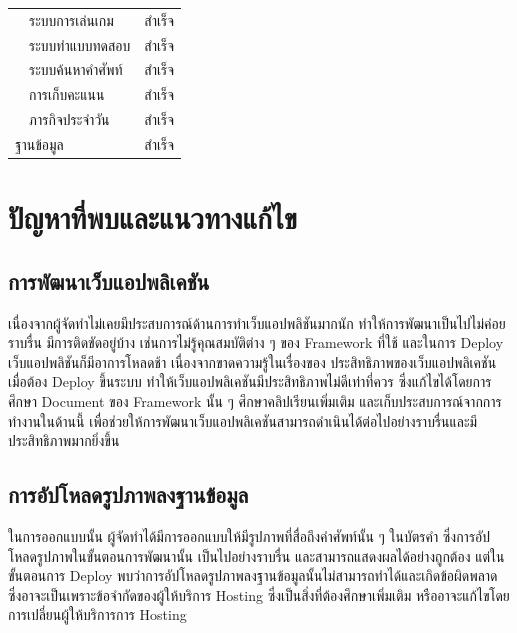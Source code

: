 \documentclass[12pt,oneside,openright,a4paper]{cpe-thai-project}
\begin{document}
\begin{table}[h]
\begin{tabular}{|llc|}
		\multicolumn{1}{|l|}{}                                     & \multicolumn{1}{l|}{ระบบการเล่นเกม}  & สำเร็จ \\ \cline{2-3}
		\multicolumn{1}{|l|}{}                                     & \multicolumn{1}{l|}{ระบบทำแบบทดสอบ}  & สำเร็จ \\ \cline{2-3}
		\multicolumn{1}{|l|}{}                                     & \multicolumn{1}{l|}{ระบบค้นหาคำศัพท์}   & สำเร็จ \\ \cline{2-3}
		\multicolumn{1}{|l|}{}                                     & \multicolumn{1}{l|}{การเก็บคะแนน}    & สำเร็จ \\ \cline{2-3}
		\multicolumn{1}{|l|}{}                                     & \multicolumn{1}{l|}{ภารกิจประจำวัน}    & สำเร็จ \\ \hline
		\multicolumn{2}{|l|}{ฐานข้อมูล}                              & สำเร็จ                                       \\ \hline
	\end{tabular}
\end{table}

\section{ปัญหาที่พบและแนวทางแก้ไข}
\subsection{การพัฒนาเว็บแอปพลิเคชัน}
\hspace{1cm}
เนื่องจากผู้จัดทำไม่เคยมีประสบการณ์ด้านการทำเว็บแอปพลิชันมากนัก ทำให้การพัฒนาเป็นไปไม่ค่อยราบรื่น มีการติดขัดอยู่บ้าง
เช่นการไม่รู้คุณสมบัติต่าง ๆ ของ Framework ที่ใช้ และในการ Deploy เว็บแอปพลิชันก็มีอาการโหลดช้า เนื่องจากขาดความรู้ในเรื่องของ
ประสิทธิภาพของเว็บแอปพลิเคชันเมื่อต้อง Deploy ขึ้นระบบ ทำให้เว็บแอปพลิเคชันมีประสิทธิภาพไม่ดีเท่าที่ควร
ซึ่งแก้ไขได้โดยการศึกษา Document ของ Framework นั้น ๆ ศึกษาคลิปเรียนเพิ่มเติม และเก็บประสบการณ์จากการทำงานในด้านนี้
เพื่อช่วยให้การพัฒนาเว็บแอปพลิเคชันสามารถดำเนินได้ต่อไปอย่างราบรื่นและมีประสิทธิภาพมากยิ่งขึ้น

\subsection{การอัปโหลดรูปภาพลงฐานข้อมูล}
\hspace{1cm}
ในการออกแบบนั้น ผู้จัดทำได้มีการออกแบบให้มีรูปภาพที่สื่อถึงคำศัพท์นั้น ๆ ในบัตรคำ ซึ่งการอัปโหลดรูปภาพในขั้นตอนการพัฒนานั้น
เป็นไปอย่างราบรื่น และสามารถแสดงผลได้อย่างถูกต้อง แต่ในขั้นตอนการ Deploy พบว่าการอัปโหลดรูปภาพลงฐานข้อมูลนั้นไม่สามารถทำได้และเกิดข้อผิดพลาด
ซึ่งอาจะเป็นเพราะข้อจำกัดของผู้ให้บริการ Hosting ซึ่งเป็นสิ่งที่ต้องศึกษาเพิ่มเติม หรืออาจะแก้ไขโดยการเปลี่ยนผู้ให้บริการการ Hosting
\end{document}
